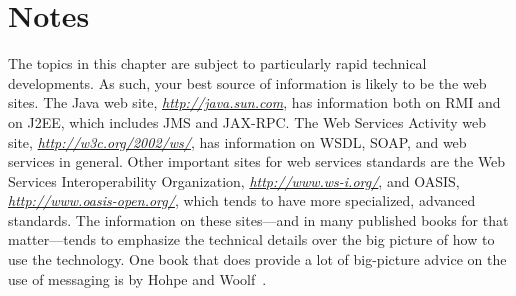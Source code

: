 \section*{Notes}
The topics in this chapter are subject to particularly rapid technical
developments.  As such, your best source of information is likely to
be the web sites.  The Java web site, \textit{\url{http://java.sun.com}}, has
information both on RMI and on J2EE, which includes JMS and JAX-RPC.
The Web Services Activity web site, \textit{\url{http://w3c.org/2002/ws/}}, has
information on WSDL, SOAP, and web services in general.  Other
important sites for web services standards are the Web Services
Interoperability Organization, \textit{\url{http://www.ws-i.org/}}, and OASIS,
\textit{\url{http://www.oasis-open.org/}}, which tends to have more specialized,
advanced standards.  The information on these sites---and in many
published books for that matter---tends to emphasize the technical
details over the big picture of how to use the technology.  One book
that does provide a lot of big-picture advice on the use of messaging
is by Hohpe and Woolf~\cite{max1157}.

